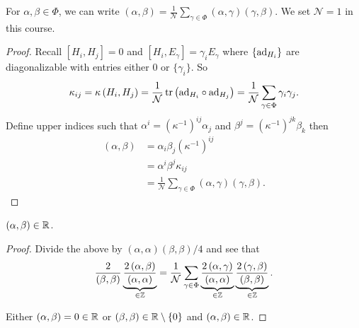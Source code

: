 \begin{claim}
    For $\alpha, \beta \in \Phi$, we can write $\left( \alpha, \beta \right) = \frac{1}{\mathcal{N}} \sum_{\gamma \in \Phi}^{} \left( \alpha, \gamma \right) \left( \gamma, \beta \right) $. We set $\mathcal{N} = 1$ in this course.
\end{claim}

\begin{proof}
    Recall $\left[ H_{i}, H_{j} \right] = 0$ and $\left[ H_{i}, E_{\gamma} \right] = \gamma_{i} E_{\gamma}$ where $\{\text{ad}_{H_{i}}\} $ are diagonalizable with entries either 0 or $\{\gamma_{i}\} $. So 
    \begin{align}
        \kappa_{ij} = \kappa \left( H_{i}, H_{j} \right) = \frac{1}{\mathcal{N}} \tr \left( \text{ad}_{H_{i}} \circ \text{ad}_{H_{j}} \right) = \frac{1}{\mathcal{N}} \sum_{\gamma \in \Phi}^{} \gamma_{i} \gamma_{j}
    .\end{align}
    Define upper indices such that $\alpha^{i} = \left( \kappa^{-1} \right)^{ij}\alpha_j$ and $\beta^{j} = \left( \kappa^{-1} \right)^{jk} \beta_k$ then 
    \begin{align}
        \left( \alpha, \beta \right) &= \alpha_i \beta_j \left( \kappa^{-1} \right)^{ij}  \\
        &= \alpha^{i} \beta^{j}\kappa_{ij} \\
        &= \frac{1}{\mathcal{N}} \sum_{\gamma \in \Phi}^{} \left( \alpha, \gamma \right) \left( \gamma , \beta \right)
    .\end{align}
\end{proof}

\begin{claim}
    $\left( \alpha, \beta \right) \in \mathbb{R}$. 
\end{claim}

\begin{proof}
    Divide the above by $\left( \alpha , \alpha \right) \left( \beta, \beta \right) / 4$ and see that
    \begin{align}
        \frac{2}{\left( \beta, \beta \right) } \underbrace{\frac{2 \left( \alpha, \beta \right) }{\left( \alpha, \alpha \right) }}_{\in \mathbb{Z}} = \frac{1}{\mathcal{N}} \sum_{\gamma \in \Phi}^{} \underbrace{\frac{2 \left( \alpha, \gamma \right) }{\left( \alpha , \alpha \right) }}_{\in \mathbb{Z}} \underbrace{\frac{2 \left( \gamma, \beta \right) }{\left( \beta, \beta \right) }}_{\in \mathbb{Z}}
    .\end{align}

    Either $\left( \alpha, \beta \right) = 0 \in \mathbb{R}$ or $\left( \beta, \beta  \right) \in \mathbb{R} \setminus \{0\} $ and $\left( \alpha, \beta \right) \in \mathbb{R}$.
\end{proof}






